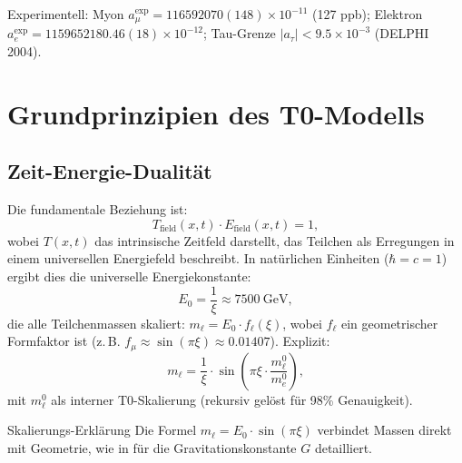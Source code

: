 \documentclass[12pt,a4paper]{article}
\begin{document}
	Experimentell: Myon $a_\mu^\text{exp} = 116592070(148) \times 10^{-11}$ (127 ppb); Elektron $a_e^\text{exp} = 1159652180.46(18) \times 10^{-12}$; Tau-Grenze $|a_\tau| < 9.5 \times 10^{-3}$ (DELPHI 2004).
	
	\section{Grundprinzipien des T0-Modells}
	\subsection{Zeit-Energie-Dualität}
	Die fundamentale Beziehung ist:
	\begin{equation}
		T_{\text{field}}(x,t) \cdot E_{\text{field}}(x,t) = 1,
	\end{equation}
	wobei $T(x,t)$ das intrinsische Zeitfeld darstellt, das Teilchen als Erregungen in einem universellen Energiefeld beschreibt. In natürlichen Einheiten ($\hbar = c = 1$) ergibt dies die universelle Energiekonstante:
	\begin{equation}
		E_0 = \frac{1}{\xi} \approx \SI{7500}{\giga\electronvolt},
	\end{equation}
	die alle Teilchenmassen skaliert: $m_\ell = E_0 \cdot f_\ell(\xi)$, wobei $f_\ell$ ein geometrischer Formfaktor ist (z.\,B. $f_\mu \approx \sin(\pi \xi) \approx 0.01407$). Explizit:
	\begin{equation}
		m_\ell = \frac{1}{\xi} \cdot \sin\left(\pi \xi \cdot \frac{m_\ell^0}{m_e^0}\right),
	\end{equation}
	mit $m_\ell^0$ als interner T0-Skalierung (rekursiv gelöst für 98\% Genauigkeit).
	
	\begin{explanation}{Skalierungs-Erklärung}
		Die Formel $m_\ell = E_0 \cdot \sin(\pi \xi)$ verbindet Massen direkt mit Geometrie, wie in \cite{T0_gravitational_constant} für die Gravitationskonstante $G$ detailliert.
	\end{explanation}
	
\end{document}
